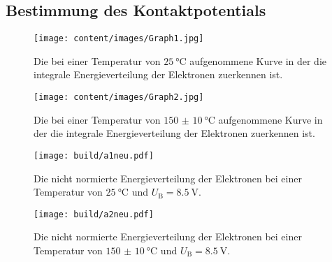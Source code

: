 \subsection{Bestimmung des Kontaktpotentials}
\label{subsec:Bestimmung_des_Kontaktpotentials}
\begin{figure}
	\centering
	\caption{Die bei einer Temperatur von $\SI{25}{\degreeCelsius}$ aufgenommene Kurve in der die integrale Energieverteilung der Elektronen zuerkennen ist.}
	\texttt{[image: content/images/Graph1.jpg]}
	\label{fig:a1}
\end{figure}
\begin{figure}
	\centering
	\caption{Die bei einer Temperatur von $\SI{150(10)}{\degreeCelsius}$ aufgenommene Kurve in der die integrale Energieverteilung der Elektronen zuerkennen ist.}
	\texttt{[image: content/images/Graph2.jpg]}
	\label{fig:a2}
\end{figure}
\begin{figure}
	\centering
	\caption{Die nicht normierte Energieverteilung der Elektronen bei einer Temperatur von $\SI{25}{\degreeCelsius}$ und $U_\text{B}=\SI{8.5}{\volt}$.}
	\texttt{[image: build/a1neu.pdf]}
	\label{fig:a1A}
\end{figure}
\begin{figure}
	\centering
	\caption{Die nicht normierte Energieverteilung der Elektronen bei einer Temperatur von $\SI{150(10)}{\degreeCelsius}$ und $U_\text{B}=\SI{8.5}{\volt}$.}
	\texttt{[image: build/a2neu.pdf]}
	\label{fig:a2A}
\end{figure}
\begin{center}
	\begin{table}
		\begin{minipage}[t]{0.5\textwidth}
			\setcapwidth[c]{\textwidth}%
			\caption{Das bei den verschieden Gegenspannungen $U_\text{A}$ gemessene Gefälle $\overline{I}$ des Graphen in Abbildung \ref{fig:a1}.}
			\centering
			
		\end{minipage}
		\begin{minipage}[t]{0.5\textwidth}
			\setcapwidth[c]{\textwidth}%
			\caption{Das bei den verschieden Gegenspannungen $U_\text{A}$ gemessene Gefälle $\overline{I}$ des Graphen in Abbildung \ref{fig:a2}.}
			\centering
			
		\end{minipage}
	\end{table}
\end{center}
